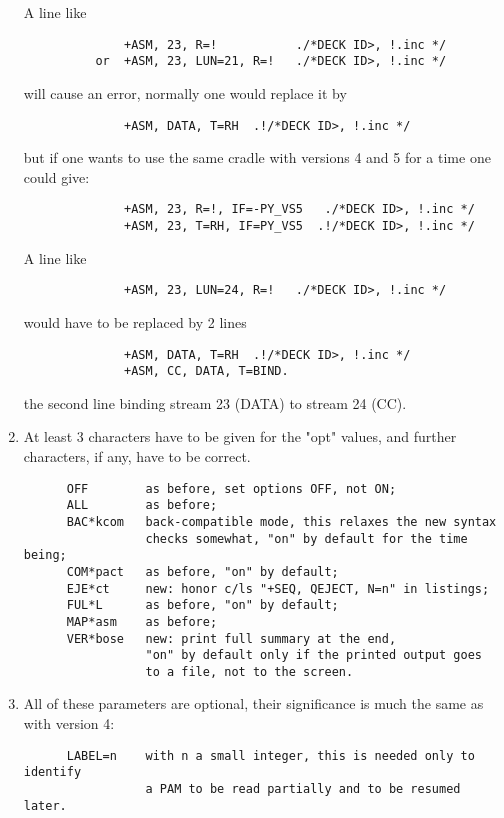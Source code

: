 \begin{enumerate}
A line like
\begin{verbatim}
              +ASM, 23, R=!           ./*DECK ID>, !.inc */
          or  +ASM, 23, LUN=21, R=!   ./*DECK ID>, !.inc */
\end{verbatim}
will cause an error, normally one would replace it by
\begin{verbatim}
              +ASM, DATA, T=RH  .!/*DECK ID>, !.inc */
\end{verbatim}
but if one wants to use the same cradle with versions 4 and 5 for
a time one could give:
\begin{verbatim}
              +ASM, 23, R=!, IF=-PY_VS5   ./*DECK ID>, !.inc */
              +ASM, 23, T=RH, IF=PY_VS5  .!/*DECK ID>, !.inc */
\end{verbatim}
A line like
\begin{verbatim}
              +ASM, 23, LUN=24, R=!   ./*DECK ID>, !.inc */
\end{verbatim}
would have to be replaced by 2 lines
\begin{verbatim}
              +ASM, DATA, T=RH  .!/*DECK ID>, !.inc */
              +ASM, CC, DATA, T=BIND.
\end{verbatim}
the second line binding stream 23 (DATA) to stream 24 (CC).

\item
{}

At least 3 characters have to be given for the "opt" values,
and further characters, if any, have to be correct.
\begin{verbatim}
      OFF        as before, set options OFF, not ON;
      ALL        as before;
      BAC*kcom   back-compatible mode, this relaxes the new syntax
                 checks somewhat, "on" by default for the time being;
      COM*pact   as before, "on" by default;
      EJE*ct     new: honor c/ls "+SEQ, QEJECT, N=n" in listings;
      FUL*L      as before, "on" by default;
      MAP*asm    as before;
      VER*bose   new: print full summary at the end,
                 "on" by default only if the printed output goes
                 to a file, not to the screen.
\end{verbatim}

\item
{}

All of these parameters are optional, their significance is much
the same as with version 4:
\begin{verbatim}
      LABEL=n    with n a small integer, this is needed only to identify
                 a PAM to be read partially and to be resumed later.


\end{verbatim}
\end{enumerate}
